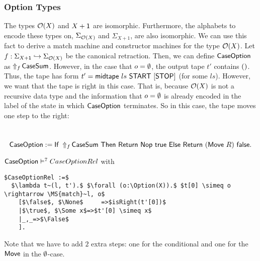 \subsubsection{Option Types}
\label{sec:match-option}

The types $\Option(X)$ and $X+\Unit$ are isomorphic.  Furthermore, the alphabets to encode these types on, $\Sigma_{\Option(X)}$ and $\Sigma_{X+1}$,
are also isomorphic.  We can use this fact to derive a match machine and constructor machines for the type $\Option(X)$.  Let
$f : \Sigma_{X+\Unit} \hookrightarrow \Sigma_{\Option(X)}$ be the canonical retraction.  Then, we can define $\MS{CaseOption}$ as
$\LiftAlphabet{\MS{CaseSum}}{f}$.  However, in the case that $o=\None$, the output tape $t'$ contains $\unit$.  Thus, the tape has form
$t' = \MS{midtape}~ls~\MS{START}~[\MS{STOP}]$ (for some $ls$).  However, we want that the tape is right in this case.  That is, because $\Option(X)$
is not a recursive data type and the information that $o=\None$ is already encoded in the label of the state in which $\MS{CaseOption}$ terminates.
So in this case, the tape moves one step to the right:
\begin{definition}[$\MS{CaseOption}$][CaseOption]
  \label{def:CaseOption}
  ~
  \[
    \MS{CaseOption} := \If{\LiftAlphabet{\MS{CaseSum}}{f}}{\Return{\Nop}{\true}}{\Return{(\MS{Move}~R)}{\false}}.
  \]
\end{definition}

\begin{lemma}
  \label{lem:CaseOption_Realise}
  $\MS{CaseOption} \RealiseIn{7} CaseOptionRel$ with
\begin{lstlisting}[style=semicoqstyle]
$CaseOptionRel :=$
  $\lambda t~(l, t').$ $\forall (o:\Option(X)).$ $t[0] \simeq o \rightarrow \MS{match}~l, o$
    [$\false$, $\None$     =>$isRight(t'[0])$
    |$\true$, $\Some x$=>$t'[0] \simeq x$
    |_,_=>$\False$
    ].
\end{lstlisting}
\end{lemma}
Note that we have to add $2$ extra steps: one for the conditional and one for the $\MS{Move}$ in the $\None$-case.

